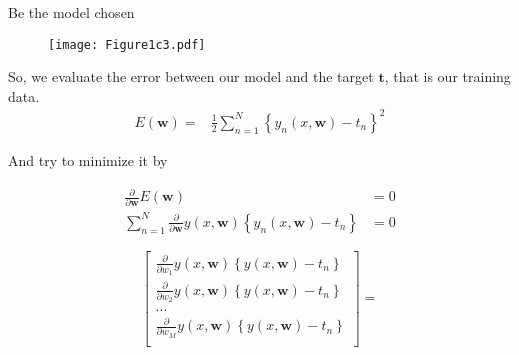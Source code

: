 \begin{frame}{\insertsubsection}

Be the model chosen 
\end{frame}

\begin{frame}{\insertsubsection}
	\begin{figure}
		\texttt{[image: Figure1c3.pdf]}
	\end{figure}
\end{frame}

\begin{frame}{\insertsubsection}
So, we evaluate the error between our model and the target $\mathbf{t}$, that is our training data.
\begin{align}
	E(\mathbf{w}) =& \frac{1}{2} \sum_{n=1}^N \left\{ y_n(x,\mathbf{w}) -  t_n \right\}^2
\end{align}

And try to minimize it by

\begin{align}
	\frac{\partial}{\partial \mathbf{w}} E(\mathbf{w}) &= 0 \nonumber \\
	\sum_{n=1}^N \frac{\partial}{\partial \mathbf{w}} y(x,\mathbf{w}) \left\{  y_n(x,\mathbf{w}) -  t_n \right\} &= 0
\end{align}

\end{frame}

\begin{frame}{\insertsubsection}

\begin{equation}
\begin{bmatrix}

\frac{\partial}{\partial w_1} y(x,\mathbf{w}) \left\{  y(x,\mathbf{w}) -  t_n \right\} \\
\frac{\partial}{\partial w_2} y(x,\mathbf{w}) \left\{  y(x,\mathbf{w}) -  t_n \right\} \\
... \\
\frac{\partial}{\partial w_M} y(x,\mathbf{w}) \left\{  y(x,\mathbf{w}) -  t_n \right\} \\

\end{bmatrix} = 
\end{equation}

\end{frame}


